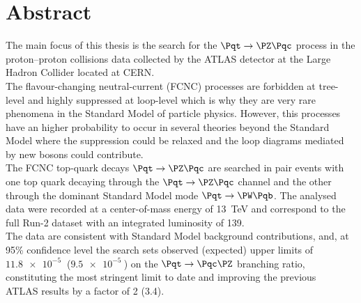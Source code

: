 \chapter*{Abstract}        %

\vspace{-1cm}
\begin{adjustwidth}{1.5cm}{1.5cm}
	The main focus of this thesis is the search for the $\Pqt\rightarrow\PZ\Pqc$ process in the 
	proton–proton collisions data collected by the ATLAS detector at 
	the Large Hadron Collider located at CERN.\\		
	The flavour-changing neutral-current (FCNC) processes are forbidden at tree-level and 
	highly suppressed at loop-level which is why they are very rare phenomena in the Standard Model of particle physics.
	However, this processes have an higher probability to occur in several theories beyond the Standard Model where the 
	suppression could be relaxed and the loop diagrams mediated by new bosons could contribute.\\	
	The FCNC top-quark decays $\mathrm{\Pqt\rightarrow\PZ\Pqc}$ are searched in 
	\ttbar pair events with one top quark decaying through the $\mathrm{\Pqt\rightarrow\PZ\Pqc}$ channel 
	and the other through the dominant Standard Model mode $\mathrm{\Pqt\rightarrow\PW\Pqb}$.
	The analysed data were recorded at a center-of-mass energy of \SI{13}{\TeV} and correspond to the full Run-2 dataset 
	with an integrated luminosity of \SI{139}{\ifb}.\\
	The data are consistent with Standard Model background contributions, and, at 95\% confidence level the search sets observed (expected) upper limits of $\mathrm{\SI{11.8e-5}{}}$ ($\mathrm{\SI{9.5e-5}{}}$) on the $\mathrm{\Pqt\rightarrow\Pqc\PZ}$ branching ratio, constituting the most stringent limit to date and improving the previous\\ ATLAS results by a factor of 2 (3.4).
	
	
\end{adjustwidth}



